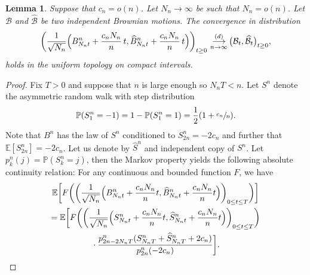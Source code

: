 \documentclass[10pt]{amsart}
\theoremstyle{plain}
\newtheorem{lemma}[theorem]{Lemma}
\theoremstyle{definition}
\theoremstyle{remark}
\renewcommand{\P}{\mathbb{P}}
\newcommand{\E}{\mathbb{E}}
\newcommand{\cvloi}[1][n]{\,\mathop{\longrightarrow}^{(d)}_{#1 \to \infty}\,}
\begin{document}
\begin{lemma}\label{lem:cv_recentre_brownien}
Suppose that $c_n = o(n)$. Let $N_{n}\to \infty$ be such that $N_{n} = o(n)$. Let $\mathcal{B}$ and $\widehat{ \mathcal{B}}$ be two independent Brownian motions.
The convergence in distribution\vspace*{-3pt}\enlargethispage{.5\baselineskip}%
\[
\biggl(\frac{1}{\sqrt{N_{n}}} \Bigl(B^{n}_{N_{n}t}+\frac{c_{n} N_{n}}{n}\,t, \widehat{B}^{n}_{N_{n}t}+\frac{c_{n} N_{n}}{n}\,t\Bigr)\biggr)_{t \ge 0}
\cvloi \bigl(\mathcal{B}_{t}, \widehat{ \mathcal{B}}_{t}\bigr)_{t \ge 0},
\]
holds in the uniform topology on compact intervals.
\end{lemma}

\begin{proof}
Fix $T>0$ and suppose that $n$ is large enough so $N_n T < n$. Let $S^{n}$ denote the asymmetric random walk with step distribution\vspace*{-3pt}
\[
\P(S^{n}_{1} = -1) = 1-\P(S^{n}_{1} = 1) = \frac{1}{2}(1+\sfrac{c_{n}}{n}).
\]
Note that $B^{n}$ has the law of $S^{n}$ conditioned to $S^n_{2n} = -2c_{n}$ and further that $\E[S^{n}_{2n}] = -2c_{n}$. Let us denote by $\widehat{S}^{n}$ and independent copy of $S^{n}$.
Let $p^n_k(j) = \P(S^n_k = j)$, then the Markov property yields the following absolute continuity relation: For any continuous and bounded function $F$, we have\vspace*{-5pt}
\begin{multline*}
\E\biggl[F\biggl(\biggl(\frac{1}{\sqrt{N_{n}}} \Bigl(B^{n}_{N_{n}t}+\frac{c_{n} N_{n}}{n}t, \widehat{B}^{n}_{N_{n}t}+\frac{c_{n} N_{n}}{n}t\Bigr)\biggr)_{0 \le t \le T}\biggr) \biggr]
\\
= \E\biggl[F\biggl(\biggl(\frac{1}{\sqrt{N_{n}}} \Bigl(S^{n}_{N_{n}t}+\frac{c_{n} N_{n}}{n}t, \widehat{S}^{n}_{N_{n}t}+\frac{c_{n} N_{n}}{n}t\Bigr)\biggr)_{0 \le t \le T}\biggr)\\
{}\cdot\frac{p^n_{2n-2N_{n}T}(S^{n}_{N_{n}T}+\widehat{S}^{n}_{N_{n}T}+2c_{n})}{p^n_{2n}(-2c_{n})}\biggr].
\end{multline*}


\end{proof}
\end{document}
